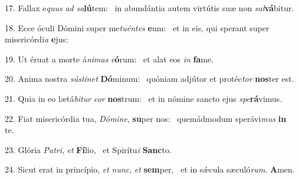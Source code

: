 17. Fallax e\textit{quus} \textit{ad} \textit{sa}\textbf{lú}tem: \ast\  in abundántia autem virtútis suæ non \textit{sal}\textbf{vá}bitur.\

18. Ecce óculi Dómini super me\textit{tu}\textit{én}\textit{tes} \textbf{e}um: \ast\  et in eis, qui sperant super misericórdi\textit{a} \textbf{e}jus:\

19. Ut éruat a morte á\textit{ni}\textit{mas} \textit{e}\textbf{ó}rum: \ast\  et alat eos \textit{in} \textbf{fa}me.\

20. Anima nostra \textit{sús}\textit{ti}\textit{net} \textbf{Dó}minum: \ast\  quóniam adjútor et protéc\textit{tor} \textbf{nos}ter est.\

21. Quia in eo lætá\textit{bi}\textit{tur} \textit{cor} \textbf{nos}trum: \ast\  et in nómine sancto ejus \textit{spe}\textbf{rá}vimus.\

22. Fiat misericórdia tua, \textit{Dó}\textit{mi}\textit{ne}, \textbf{su}per nos: \ast\  quemádmodum sperávi\textit{mus} \textbf{in} te.\

23. Glória \textit{Pa}\textit{tri}, \textit{et} \textbf{Fí}lio, \ast\  et Spirítu\textit{i} \textbf{Sanc}to.\

24. Sicut erat in princípio, \textit{et} \textit{nunc}, \textit{et} \textbf{sem}per, \ast\  et in sǽcula sæculó\textit{rum}. \textbf{A}men.\


